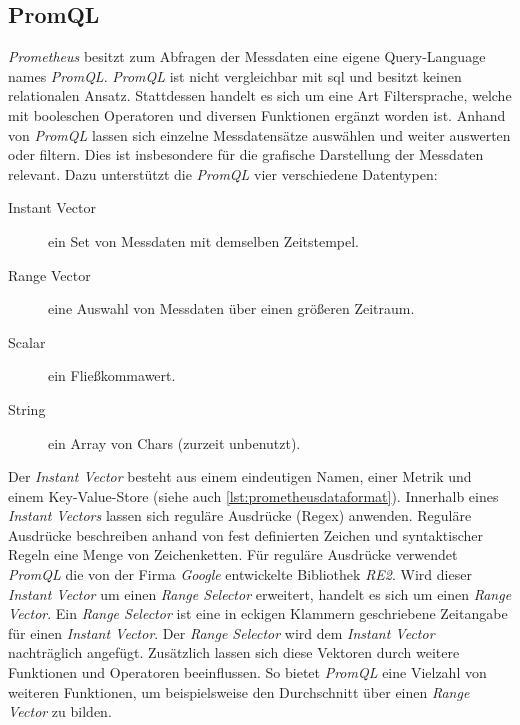 \documentclass[titlepage]{report}
\begin{document}
\subsection*{PromQL}
\emph{Prometheus} besitzt zum Abfragen der Messdaten eine eigene
Query\hyp{}Language names \emph{PromQL}. \emph{PromQL} ist nicht
vergleichbar mit \gls{sql} und besitzt keinen relationalen Ansatz.
Stattdessen handelt es sich um eine Art Filtersprache, welche mit
booleschen Operatoren und diversen Funktionen ergänzt worden ist.
Anhand von \emph{PromQL} lassen sich einzelne Messdatensätze auswählen
und weiter auswerten oder filtern\cite{PROMETHEUS_PROMQL}. Dies ist insbesondere für die
grafische Darstellung der Messdaten relevant. Dazu unterstützt die
\emph{PromQL} vier verschiedene Datentypen\cite{PROMETHEUS_PROMQL}:
\begin{description}
    \item[Instant Vector] ein Set von Messdaten mit demselben
        Zeitstempel.
    \item[Range Vector] eine Auswahl von Messdaten über einen größeren
        Zeitraum.
    \item[Scalar] ein Fließkommawert.
    \item[String] ein Array von Chars (zurzeit unbenutzt).
\end{description}
Der \emph{Instant Vector} besteht aus einem eindeutigen Namen, einer
Metrik und einem Key\hyp{}Value\hyp{}Store (siehe auch
\autoref{lst:prometheusdataformat}). Innerhalb eines \emph{Instant
Vectors} lassen sich reguläre Ausdrücke (Regex)
anwenden. Reguläre Ausdrücke beschreiben anhand von fest definierten
Zeichen und syntaktischer Regeln eine Menge von
Zeichenketten\cite{REGEXWIKI}. Für reguläre Ausdrücke verwendet
\emph{PromQL} die von der Firma \emph{Google} entwickelte Bibliothek
\emph{RE2}\cite{RE2}. Wird dieser \emph{Instant Vector} um einen
\emph{Range Selector} erweitert, handelt es sich um einen \emph{Range
Vector}. Ein \emph{Range Selector} ist eine in eckigen Klammern
geschriebene Zeitangabe für einen \emph{Instant Vector}. Der \emph{Range
Selector} wird dem \emph{Instant Vector} nachträglich angefügt.
Zusätzlich lassen sich diese Vektoren durch weitere Funktionen und
Operatoren beeinflussen. So bietet \emph{PromQL} eine Vielzahl von
weiteren Funktionen, um beispielsweise den Durchschnitt über einen
\emph{Range Vector} zu bilden\cite{PROMETHEUS_PROMQL_FUNCTIONS}.
\end{document}

